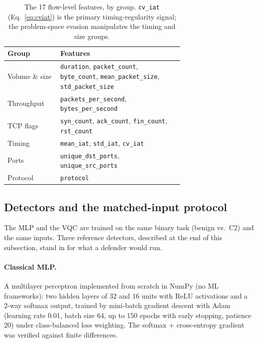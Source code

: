 \documentclass[preprint,12pt]{elsarticle}
\begin{document}
\begin{table}[htbp]
\centering
\caption{The 17 flow-level features, by group. \texttt{cv\_iat} (Eq.~\ref{eq:cviat}) is the primary
timing-regularity signal; the problem-space evasion manipulates the timing and size groups.}
\label{tab:features}
\begin{tabular}{l p{0.70\linewidth}}
\toprule
Group & Features \\
\midrule
Volume \& size & \texttt{duration}, \texttt{packet\_count}, \texttt{byte\_count}, \texttt{mean\_packet\_size}, \texttt{std\_packet\_size} \\
Throughput    & \texttt{packets\_per\_second}, \texttt{bytes\_per\_second} \\
TCP flags     & \texttt{syn\_count}, \texttt{ack\_count}, \texttt{fin\_count}, \texttt{rst\_count} \\
Timing        & \texttt{mean\_iat}, \texttt{std\_iat}, \texttt{cv\_iat} \\
Ports         & \texttt{unique\_dst\_ports}, \texttt{unique\_src\_ports} \\
Protocol      & \texttt{protocol} \\
\bottomrule
\end{tabular}
\end{table}

\subsection{Detectors and the matched-input protocol}
\label{sec:detectors}
The MLP and the VQC are trained on the same binary task (benign vs.\ C2) and the same inputs. Three
reference detectors, described at the end of this subsection, stand in for what a defender would run.

\paragraph{Classical MLP.} A multilayer perceptron implemented from scratch in NumPy (no ML
frameworks): two hidden layers of 32 and 16 units with ReLU activations and a 2-way softmax output,
trained by mini-batch gradient descent with Adam (learning rate 0.01, batch size 64, up to 150 epochs
with early stopping, patience 20) under class-balanced loss weighting. The softmax + cross-entropy
gradient was verified against finite differences.
\end{document}
